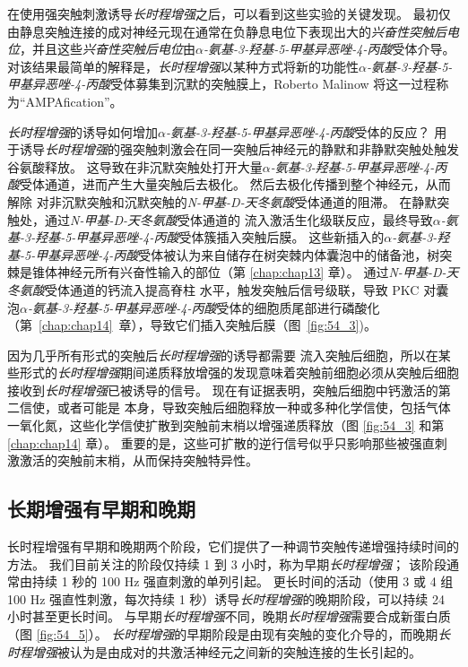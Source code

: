 在使用强突触刺激诱导\textit{长时程增强}之后，可以看到这些实验的关键发现。
最初仅由静息突触连接的成对神经元现在通常在负静息电位下表现出大的\textit{兴奋性突触后电位}，并且这些\textit{兴奋性突触后电位}由\textit{$\alpha$-氨基-3-羟基-5-甲基异恶唑-4-丙酸}受体介导。
对该结果最简单的解释是，\textit{长时程增强}以某种方式将新的功能性\textit{$\alpha$-氨基-3-羟基-5-甲基异恶唑-4-丙酸}受体募集到沉默的突触膜上，Roberto Malinow 将这一过程称为“AMPAfication”。


\textit{长时程增强}的诱导如何增加\textit{$\alpha$-氨基-3-羟基-5-甲基异恶唑-4-丙酸}受体的反应？
用于诱导\textit{长时程增强}的强突触刺激会在同一突触后神经元的静默和非静默突触处触发谷氨酸释放。
这导致在非沉默突触处打开大量\textit{$\alpha$-氨基-3-羟基-5-甲基异恶唑-4-丙酸}受体通道，进而产生大量突触后去极化。
然后去极化传播到整个神经元，从而解除  对非沉默突触和沉默突触的\textit{N-甲基-D-天冬氨酸}受体通道的阻滞。
在静默突触处，通过\textit{N-甲基-D-天冬氨酸}受体通道的  流入激活生化级联反应，最终导致\textit{$\alpha$-氨基-3-羟基-5-甲基异恶唑-4-丙酸}受体簇插入突触后膜。
这些新插入的\textit{$\alpha$-氨基-3-羟基-5-甲基异恶唑-4-丙酸}受体被认为来自储存在树突棘内体囊泡中的储备池，树突棘是锥体神经元所有兴奋性输入的部位（第 \ref{chap:chap13} 章）。
通过\textit{N-甲基-D-天冬氨酸}受体通道的钙流入提高脊柱  水平，触发突触后信号级联，导致 PKC 对囊泡\textit{$\alpha$-氨基-3-羟基-5-甲基异恶唑-4-丙酸}受体的细胞质尾部进行磷酸化（第~\ref{chap:chap14}~章），导致它们插入突触后膜（图~\ref{fig:54_3})。


因为几乎所有形式的突触后\textit{长时程增强}的诱导都需要  流入突触后细胞，所以在某些形式的\textit{长时程增强}期间递质释放增强的发现意味着突触前细胞必须从突触后细胞接收到\textit{长时程增强}已被诱导的信号。
现在有证据表明，突触后细胞中钙激活的第二信使，或者可能是  本身，导致突触后细胞释放一种或多种化学信使，包括气体一氧化氮，这些化学信使扩散到突触前末梢以增强递质释放（图 \ref{fig:54_3} 和第 \ref{chap:chap14} 章）。
重要的是，这些可扩散的逆行信号似乎只影响那些被强直刺激激活的突触前末梢，从而保持突触特异性。



\subsection{长期增强有早期和晚期}

长时程增强有早期和晚期两个阶段，它们提供了一种调节突触传递增强持续时间的方法。
我们目前关注的阶段仅持续 1 到 3 小时，称为早期\textit{长时程增强}；
该阶段通常由持续 1 秒的 100 Hz 强直刺激的单列引起。
更长时间的活动（使用 3 或 4 组 100 Hz 强直性刺激，每次持续 1 秒）诱导\textit{长时程增强}的晚期阶段，可以持续 24 小时甚至更长时间。
与早期\textit{长时程增强}不同，晚期\textit{长时程增强}需要合成新蛋白质（图 \ref{fig:54_5}）。
\textit{长时程增强}的早期阶段是由现有突触的变化介导的，而晚期\textit{长时程增强}被认为是由成对的共激活神经元之间新的突触连接的生长引起的。


